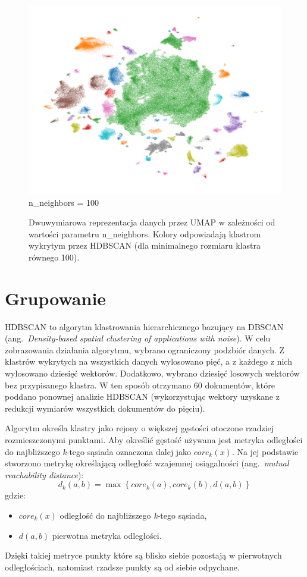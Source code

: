 \begin{figure}[htb]
\begin{minipage}{.33\textwidth}
			\includegraphics[width=\linewidth]{rys04/umap_100_100_100.png}
			n\_neighbors = 100
		\end{minipage}
		\caption[Dwuwymiarowa reprezentacja danych przez UMAP]{Dwuwymiarowa reprezentacja danych przez UMAP w zależności od wartości parametru n\_neighbors.
			Kolory odpowiadają klastrom wykrytym przez HDBSCAN (dla minimalnego rozmiaru klastra równego 100).}\label{fig:umap}
	\end{figure}
	

\section{Grupowanie}\label{sec:hdbscan}
	HDBSCAN to algorytm klastrowania hierarchicznego bazujący na DBSCAN (ang.\ \emph{Density-based spatial clustering of applications with noise}).
	W celu zobrazowania działania algorytmu, wybrano ograniczony podzbiór danych.
	Z klastrów wykrytych na wszystkich danych wylosowano pięć, a z każdego z nich wylosowano dziesięć wektorów.
	Dodatkowo, wybrano dziesięć losowych wektorów bez przypisanego klastra.
	W ten sposób otrzymano 60 dokumentów, które poddano ponownej analizie HDBSCAN
		(wykorzystując wektory uzyskane z redukcji wymiarów wszystkich dokumentów do pięciu).
	
	Algorytm określa klastry jako rejony o większej gęstości otoczone rzadziej rozmieszczonymi punktami.
	Aby określić gęstość używana jest metryka odległości do najbliższego \emph{k}-tego sąsiada oznaczona dalej jako \(core_k(x)\).
	Na jej podstawie stworzono metrykę określającą odległość wzajemnej osiągalności (ang.\ \emph{mutual reachability distance}):
	\[ d_k(a,b) = \max \left\lbrace core_k(a),core_k(b),d(a,b) \right\rbrace \]
	gdzie:
	\begin{itemize}
		\item \(core_k(x)\) odległość do najbliższego \emph{k}-tego sąsiada,
		\item \(d(a,b)\) pierwotna metryka odległości.
	\end{itemize}
	Dzięki takiej metryce punkty które są blisko siebie pozostają w pierwotnych odległościach, natomiast rzadsze punkty są od siebie odpychane.

